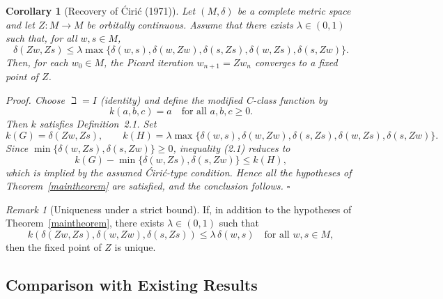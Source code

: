 \documentclass[11pt,reqno]{amsart}
\newtheorem{corollary}[theorem]{Corollary}
\theoremstyle{definition}
\theoremstyle{remark}
\newtheorem{remark}[theorem]{Remark}
\numberwithin{equation}{section}
\begin{document}
		\begin{corollary}[Recovery of Ćirić (1971)\cite{Ciric1971}] 
			Let $(M,\delta)$ be a complete metric space and let $Z:M\to M$ be orbitally continuous. 
			Assume that there exists $\lambda\in(0,1)$ such that, for all $w,s\in M$,
			\[
			\delta(Zw,Zs)\le \lambda \max\{\delta(w,s),\delta(w,Zw),\delta(s,Zs),\delta(w,Zs),\delta(s,Zw)\}.
			\]
			Then, for each $w_0\in M$, the Picard iteration $w_{n+1}=Zw_n$ converges to a fixed point of $Z$.
			
			\medskip
			
			\noindent
			\emph{Proof.} Choose $\beth=I$ (identity) and define the modified C-class function by
			\[
			k(a,b,c)=a \quad \text{for all } a,b,c\ge 0.
			\]
			Then $k$ satisfies Definition~2.1. Set
			\[
			k(G)=\delta(Zw,Zs), \qquad 
			k(H)=\lambda \max\{\delta(w,s),\delta(w,Zw),\delta(s,Zs),\delta(w,Zs),\delta(s,Zw)\}.
			\]
			Since $\min\{\delta(w,Zs),\delta(s,Zw)\}\ge 0$, inequality \textup{(2.1)} reduces to
			\[
			k(G)-\min\{\delta(w,Zs),\delta(s,Zw)\}\le k(H),
			\]
			which is implied by the assumed Ćirić-type condition. Hence all the hypotheses of Theorem~\ref{maintheorem} are satisfied, and the conclusion follows.
			\hfill$\square$
		\end{corollary}
		
		\begin{remark}[Uniqueness under a strict bound]
			If, in addition to the hypotheses of Theorem~\ref{maintheorem}, there exists $\lambda\in(0,1)$ such that
			\[
			k(\delta(Zw,Zs),\delta(w,Zw),\delta(s,Zs)) \le \lambda\,\delta(w,s)
			\quad \text{for all } w,s\in M,
			\]
			then the fixed point of $Z$ is unique.
		\end{remark}
	
		\newpage
\subsection{Comparison with Existing Results}
\end{document}
